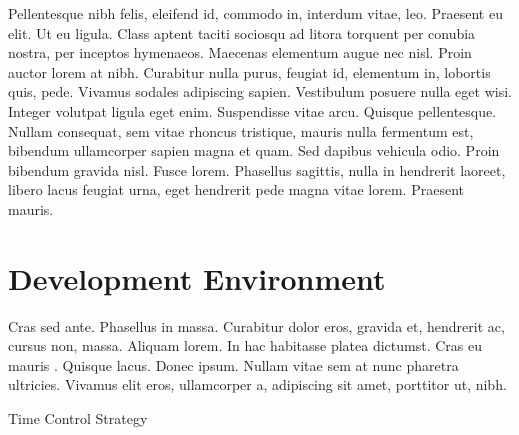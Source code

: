 Pellentesque nibh felis, eleifend id, commodo in, interdum vitae, leo. Praesent eu elit. Ut eu ligula. Class aptent taciti sociosqu ad litora torquent per conubia nostra, per inceptos hymenaeos. Maecenas elementum augue nec nisl. Proin auctor lorem at nibh. Curabitur nulla purus, feugiat id, elementum in, lobortis quis, pede. Vivamus sodales adipiscing sapien. Vestibulum posuere nulla eget wisi. Integer volutpat ligula eget enim. Suspendisse vitae arcu. Quisque pellentesque. Nullam consequat, sem vitae rhoncus tristique, mauris nulla fermentum est, bibendum ullamcorper sapien magna et quam. Sed dapibus vehicula odio. Proin bibendum gravida nisl. Fusce lorem. Phasellus sagittis, nulla in hendrerit laoreet, libero lacus feugiat urna, eget hendrerit pede magna vitae lorem. Praesent mauris.
\section{Development Environment}
Cras sed ante. Phasellus in massa. Curabitur dolor eros, gravida et, hendrerit ac, cursus non, massa. Aliquam lorem. In hac habitasse platea dictumst. Cras eu mauris . Quisque lacus. Donec ipsum. Nullam vitae sem at nunc pharetra ultricies. Vivamus elit eros, ullamcorper a, adipiscing sit amet, porttitor ut, nibh. 

\begin{algorithm}[ht]
\DontPrintSemicolon
{}
\caption{Time Control Strategy}
\label{time_control_algorithm}
\end{algorithm}


